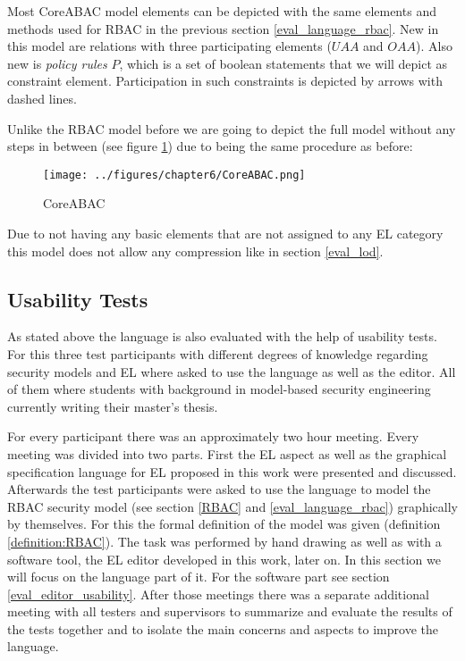 \documentclass[twoside, openright, 12pt]{book}
\begin{document}
\noindent
Most CoreABAC model elements can be depicted with the same elements and methods used for RBAC in the previous section \ref{eval_language_rbac}.
New in this model are relations with three participating elements ($\mathit{UAA}$ and $\mathit{OAA}$).
Also new is \textit{policy rules} $P$, which is a set of boolean statements that we will depict as constraint element.
Participation in such constraints is depicted by arrows with dashed lines.

Unlike the RBAC model before we are going to depict the full model without any steps in between (see figure \ref{fig:CoreABAC}) due to being the same procedure as before:

\label{eval_language_coreabac}
\begin{figure}[htb]
	\centering
	\texttt{[image: ../figures/chapter6/CoreABAC.png]}
	\caption{CoreABAC}
	\label{fig:CoreABAC}
\end{figure}

\noindent
Due to not having any basic elements that are not assigned to any EL category this model does not allow any compression like in section \ref{eval_lod}.



\subsection{Usability Tests}
\label{eval_language_usability}
As stated above the language is also evaluated with the help of usability tests.
For this three test participants with different degrees of knowledge regarding security models and EL where asked to use the language as well as the editor.
All of them where students with background in model-based security engineering currently writing their master's thesis.

For every participant there was an approximately two hour meeting.
Every meeting was divided into two parts.
First the EL aspect as well as the graphical specification language for EL proposed in this work were presented and discussed.
Afterwards the test participants were asked to use the language to model the RBAC security model (see section \ref{RBAC} and \ref{eval_language_rbac}) graphically by themselves.
For this the formal definition of the model was given (definition \ref{definition:RBAC}).
The task was performed by hand drawing as well as with a software tool, the EL editor developed in this work, later on.
In this section we will focus on the language part of it.
For the software part see section \ref{eval_editor_usability}.
After those meetings there was a separate additional meeting with all testers and supervisors to summarize and evaluate the results of the tests together and to isolate the main concerns and aspects to improve the language.
\end{document}
